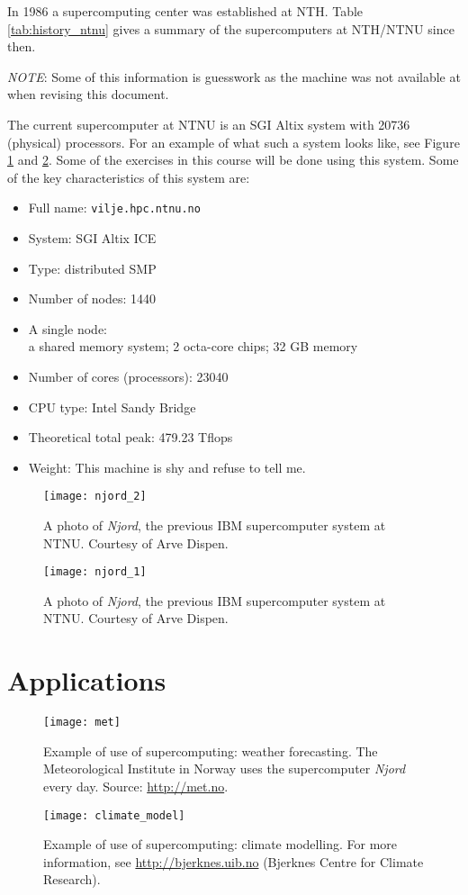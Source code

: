 In 1986 a supercomputing center was established at NTH. Table
\ref{tab:history_ntnu} gives a summary of the supercomputers at NTH/NTNU since
then.

\emph{NOTE}: Some of this information is guesswork as the machine was not available at
when revising this document.

The current supercomputer at NTNU is an SGI Altix system with 20736 (physical)
processors. For an example of what such a system looks like, see Figure
\ref{fig:njord-2} and \ref{fig:njord-1}. Some of the exercises in this course
will be done using this system. Some of the key characteristics of this system
are:
\begin{itemize}
\item Full name: \texttt{vilje.hpc.ntnu.no}
\item System: SGI Altix ICE
\item Type: distributed SMP
\item Number of nodes: 1440
\item A single node: \\
  a shared memory system; 2 octa-core chips; 32 GB memory
\item Number of cores (processors): 23040
\item CPU type: Intel Sandy Bridge
\item Theoretical total peak: 479.23 Tflops
\item Weight: This machine is shy and refuse to tell me.
\end{itemize}

\begin{figure}[!ht]
  \centering
  \texttt{[image: njord\_2]}
  \caption{
    A photo of \emph{Njord}, the previous IBM supercomputer system at NTNU.
    Courtesy of Arve Dispen.
  }
  \label{fig:njord-2}
\end{figure}

\begin{figure}[!ht]
  \centering
  \texttt{[image: njord\_1]}
  \caption{
    A photo of \emph{Njord}, the previous IBM supercomputer system at NTNU.
    Courtesy of Arve Dispen.
  }
  \label{fig:njord-1}
\end{figure}

\section{Applications}

\vspace{2cm}
\begin{figure}[!ht]
  \centering
  \texttt{[image: met]}
  \caption{
    Example of use of supercomputing: weather forecasting. The Meteorological
    Institute in Norway uses the supercomputer \emph{Njord} every day. Source:
    \protect\url{http://met.no}.
  }
  \label{fig:met}
\end{figure}

\begin{figure}[!ht]
  \centering
  \texttt{[image: climate\_model]}
  \caption{
    Example of use of supercomputing: climate modelling. For more information,
    see \protect\url{http://bjerknes.uib.no} (Bjerknes Centre for Climate Research).
  }
  \label{fig:climate}
\end{figure}
